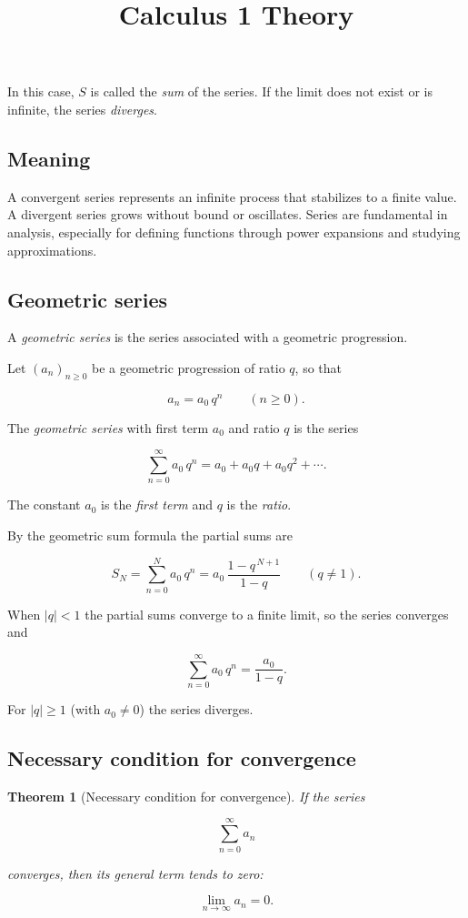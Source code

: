 \documentclass[11pt,a4paper]{article} \usepackage[T1]{fontenc}
\theoremstyle{plain} \newtheorem{theorem}{Theorem} \title{Calculus 1 Theory}
\begin{document}
In this case, $S$ is called the \emph{sum} of the series. If the limit does not
exist or is infinite, the series \emph{diverges}.

\subsection*{Meaning}

A convergent series represents an infinite process that stabilizes to a finite
value. A divergent series grows without bound or oscillates. Series are
fundamental in analysis, especially for defining functions through power
expansions and studying approximations.

\subsection {Geometric series}

A \emph{geometric series} is the series associated with a geometric
progression.

\begin{definition}
 Let $(a_n)_{n\ge 0}$ be a geometric progression of ratio
$q$, so that

\[
a_n = a_0\, q^n \qquad (n\ge 0).
\]

The \emph{geometric series} with first term $a_0$ and ratio $q$ is the series

\[
\sum_{n=0}^{\infty} a_0\, q^n = a_0 + a_0q + a_0 q^2 + \cdots .
\]

The constant $a_0$ is the \emph{first term} and $q$ is the \emph{ratio}.
\end{definition}

By the geometric sum formula the partial sums are

\[
S_N = \sum_{n=0}^{N} a_0\, q^n
= a_0\,\frac{1 - q^{\,N+1}}{1 - q}
\qquad (q\neq 1).
\]

When $|q|<1$ the partial sums converge to a finite limit, so the series
converges and

\[
\sum_{n=0}^{\infty} a_0\, q^n = \frac{a_0}{1-q}.
\]

For $|q|\ge 1$ (with $a_0\neq 0$) the series diverges.

\subsection {Necessary condition for convergence}

\begin{theorem}
[Necessary condition for convergence] If the series

\[
\sum_{n=0}^{\infty} a_n
\]

converges, then its general term tends to zero:

\[
\lim_{n\to\infty} a_n = 0.
\]

\end{theorem}
\end{document}
